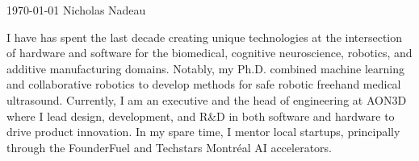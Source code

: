 \documentclass[11pt, letterpaper]{awesome-cv}
\begin{document}
\makecvheader[C]

\makecvfooter
{\today}
{Nicholas Nadeau}
{}

\makelettertitle


\begin{cvletter}


    I have has spent the last decade creating unique technologies at the intersection of hardware and software for the biomedical, cognitive neuroscience, robotics, and additive manufacturing domains.
    Notably, my Ph.D. combined machine learning and collaborative robotics to develop methods for safe robotic freehand medical ultrasound.
    Currently, I am an executive and the head of engineering at AON3D where I lead design, development, and R\&D in both software and hardware to drive product innovation.
    In my spare time, I mentor local startups, principally through the FounderFuel and Techstars Montréal AI accelerators.



\end{cvletter}

\makeletterclosing
\end{document}
